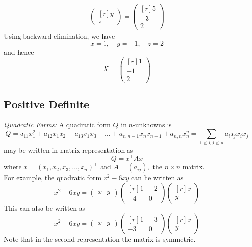 \documentclass[12pt,class=book,crop=false]{standalone}
\begin{document}
\begin{soln}
\begin{align*}
\begin{pmatrix*}[r]
            y\\
            z
        \end{pmatrix*}=\begin{pmatrix*}[r]
            5\\
            -3\\
            2
        \end{pmatrix*}
    \end{align*}
    Using backward elimination, we have
    \[x=1,\quad y=-1,\quad z=2\]
    and hence
    \[
        X=\begin{pmatrix*}[r]
            1\\
            -1\\
            2
        \end{pmatrix*}
    \]
\end{soln}
\subsection{Positive Definite}
\emph{Quadratic Forms:}  A quadratic form $ Q $ in $ n $-unknowns is%
\[
    Q=a_{11}x_1^2+a_{12}x_1x_2+a_{13}x_1x_3+\dots+a_{n,n-1}x_nx_{n-1}+a_{n,n}x_n^n=\sum_{1\leq i,j\leq n}{a_i a_j x_i x_j}
\]
may be written in matrix representation as
\[
    Q=x^\top Ax
\]
where $ x=(x_1,x_2,x_3,\dots,x_n)^\top $ and $ A = \left(a_{ij}\right), $ the $ n\times n $ matrix.\\
For example, the quadratic form $ x^2-6xy $ can be written as
\[
    x^2-6xy=\begin{pmatrix}
        x & y
    \end{pmatrix}\begin{pmatrix*}[r]
        1 & -2\\
        -4 & 0
    \end{pmatrix*}\begin{pmatrix*}[r]
        x\\
        y
    \end{pmatrix*}
\]
This can also be written as
\[
    x^2-6xy=\begin{pmatrix}
        x & y
    \end{pmatrix}\begin{pmatrix*}[r]
        1 & -3\\
        -3 & 0
    \end{pmatrix*}\begin{pmatrix*}[r]
        x\\
        y
    \end{pmatrix*}
\]
Note that in the second representation the matrix is symmetric.\\
\end{document}
